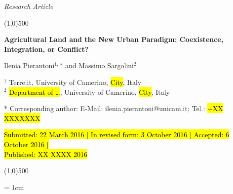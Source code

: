 \documentclass[10pt,a4paper]{article}
\begin{document}
\flushcolumns
\raggedcolumns



\pagestyle{document}
\thispagestyle{firstpage}


\vspace*{70pt}

\setlength{\parindent}{0cm}
\textit{Research Article}
\vspace*{-12pt}

\begin{center}
\line(1,0){500}
\end{center}

\vspace*{12pt}
\begin{flushleft}
\begin{LARGE}
\textbf{{\color{LibrelloColor} Agricultural Land and the New Urban Paradigm: 
Coexistence, Integration, or Conflict?}}\\
\end{LARGE}

\vspace*{12pt}

Ilenia Pierantoni$^{1,}$* and Massimo Sargolini$^2$

\vspace*{6pt}

$^1$ Terre.it, University of Camerino, \hl{City}, Italy\\
$^2$ \hl{Department of \ldots}, University of Camerino, \hl{City}, Italy

\vspace*{6pt}

* Corresponding author: E-Mail: ilenia.pierantoni@unicam.it; Tel.: \hl{+XX XXXXXXX}

\vspace*{6pt}

\hl{Submitted: 22 March 2016 $\mid$ In revised form: 3 October 2016 $\mid$ Accepted: 6 October 2016 $\mid$\\
Published: XX XXXX 2016}
\end{flushleft}


\vspace*{-18pt}
\begin{center}
\line(1,0){500}
\end{center}

\vspace*{12pt}

\begingroup\leftskip= 1cm\rightskip 1cm  
\end{document}
